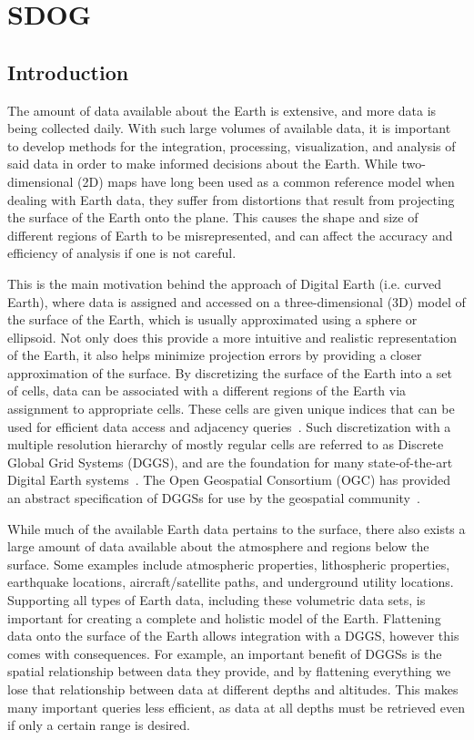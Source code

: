 
\chapter{SDOG}

\section{Introduction} \label{sec:intro}
The amount of data available about the Earth is extensive, and more data is being collected daily. With such large volumes of available data, it is important to develop methods for the integration, processing, visualization, and analysis of said data in order to make informed decisions about the Earth. While two-dimensional (2D) maps have long been used as a common reference model when dealing with Earth data, they suffer from distortions that result from projecting the surface of the Earth onto the plane. This causes the shape and size of different regions of Earth to be misrepresented, and can affect the accuracy and efficiency of analysis if one is not careful.

This is the main motivation behind the approach of Digital Earth (i.e. curved Earth), where data is assigned and accessed on a three-dimensional (3D) model of the surface of the Earth, which is usually approximated using a sphere or ellipsoid. Not only does this provide a more intuitive and realistic representation of the Earth, it also helps minimize projection errors by providing a closer approximation of the surface. By discretizing the surface of the Earth into a set of cells, data can be associated with a different regions of the Earth via assignment to appropriate cells. These cells are given unique indices that can be used for efficient data access and adjacency queries~\cite{amiri2015categorization}. Such discretization with a multiple resolution hierarchy of mostly regular cells are referred to as Discrete Global Grid Systems (DGGS), and are the foundation for many state-of-the-art Digital Earth systems~\cite{mahdavi2015survey, goodchild2018reimagining}. The Open Geospatial Consortium (OGC) has provided an abstract specification of DGGSs for use by the geospatial community~\cite{ogcDGGS}.

While much of the available Earth data pertains to the surface, there also exists a large amount of data available about the atmosphere and regions below the surface. Some examples include atmospheric properties, lithospheric properties, earthquake locations, aircraft/satellite paths, and underground utility locations. Supporting all types of Earth data, including these volumetric data sets, is important for creating a complete and holistic model of the Earth. Flattening data onto the surface  of the Earth allows integration with a DGGS, however this comes with consequences. For example, an important benefit of DGGSs is the spatial relationship between data they provide, and by flattening everything we lose that relationship between data at different depths and altitudes. This makes many important queries less efficient, as data at all depths must be retrieved even if only a certain range is desired. 

